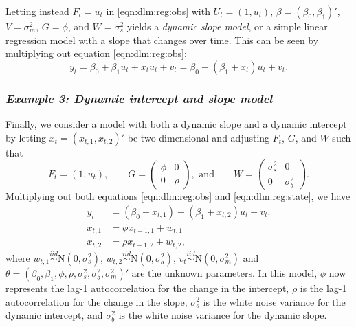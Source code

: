 Letting instead $F_t = u_t$ in \eqref{eqn:dlm:reg:obs} with $U_t = (1, u_t)$, $\beta = (\beta_0, \beta_1)'$, $V = \sigma^2_m$, $G = \phi$, and $W = \sigma^2_s$ yields a \emph{dynamic slope model}, or a simple linear regression model with a slope that changes over time. This can be seen by multiplying out equation \eqref{eqn:dlm:reg:obs}:
\begin{equation}
y_t = \beta_0 + \beta_1u_t + x_tu_t + v_t = \beta_0 + (\beta_1 + x_t)u_t + v_t. \label{eqn:arwn:dynslo}
\end{equation}

\subsubsection{\emph{Example 3: Dynamic intercept and slope model} \label{sec:dlm:M111}}

Finally, we consider a model with both a dynamic slope and a dynamic intercept by letting $x_t = (x_{t,1},x_{t,2})'$ be two-dimensional and adjusting $F_t$, $G$, and $W$ such that
\[
F_t = (1, u_t), \qquad G = \left(\begin{array}{cc} \phi & 0 \\ 0 & \rho \end{array}\right), \mbox{ and} \qquad W = \left(\begin{array}{cc} \sigma^2_s & 0 \\ 0 & \sigma^2_b \end{array}\right).
\]
Multiplying out both equations \eqref{eqn:dlm:reg:obs} and \eqref{eqn:dlm:reg:state}, we have
\begin{align}
y_t &= (\beta_0 + x_{t,1}) + (\beta_1 + x_{t,2})u_t + v_t. \label{eqn:arwn:dynboth:obs} \\
x_{t,1} &= \phi x_{t-1,1} + w_{t,1} \label{eqn:arwn:dynboth:state1} \\
x_{t,2} &= \rho x_{t-1,2} + w_{t,2}, \label{eqn:arwn:dynboth:state2}
\end{align}
where $w_{t,1} \stackrel{iid}{\sim} \mbox{N}(0,\sigma^2_s)$, $w_{t,2} \stackrel{iid}{\sim} \mbox{N}(0,\sigma^2_b)$, $v_t \stackrel{iid}{\sim} \mbox{N}(0,\sigma^2_m)$ and $\theta = (\beta_0,\beta_1,\phi,\rho,\sigma^2_s,\sigma^2_b,\sigma^2_m)'$ are the unknown parameters. In this model, $\phi$ now represents the lag-1 autocorrelation for the change in the intercept, $\rho$ is the lag-1 autocorrelation for the change in the slope, $\sigma^2_s$ is the white noise variance for the dynamic intercept, and $\sigma^2_b$ is the white noise variance for the dynamic slope.
\\

